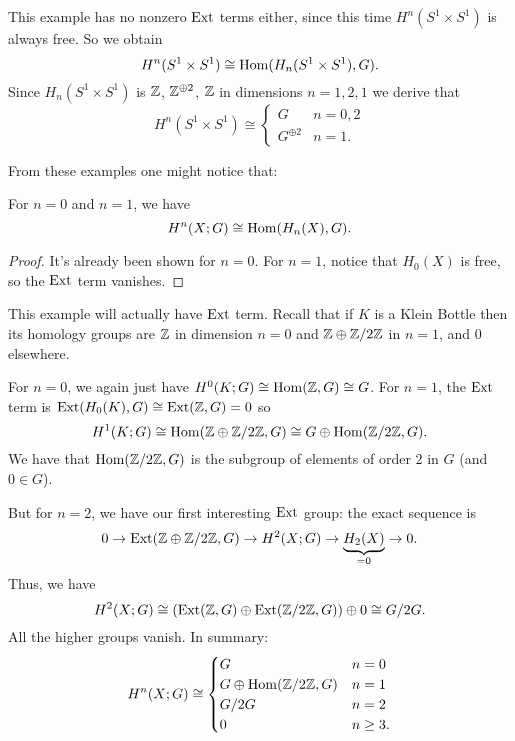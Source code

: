 \begin{example}
	This example has no nonzero $\operatorname{Ext}$ terms either,
	since this time $H^n(S^1 \times S^1)$ is always free.
	So we obtain
	\[ H^n(S^1 \times S^1) \cong \operatorname{Hom}(H_n(S^1 \times S^1), G). \]
	Since $H_n(S^1 \times S^1)$ is $\mathbb Z$, $\mathbb Z^{\oplus 2}$, $\mathbb Z$
	in dimensions $n=1,2,1$ we derive that
	\[
		H^n(S^1 \times S^1)
		\cong
		\begin{cases}
			G & n = 0,2 \\
			G^{\oplus 2} & n = 1.
		\end{cases}
	\]
\end{example}

From these examples one might notice that:
\begin{lemma}
	For $n = 0$ and $n = 1$, we have
	\[ H^n(X;G) \cong \operatorname{Hom}(H_n(X), G). \]
\end{lemma}
\begin{proof}
	It's already been shown for $n=0$.
	For $n=1$, notice that $H_0(X)$ is free,
	so the $\operatorname{Ext}$ term vanishes.
\end{proof}

\begin{example}
	This example will actually have $\operatorname{Ext}$ term.
	Recall that if $K$ is a Klein Bottle then its homology groups are
	$\mathbb Z$ in dimension $n=0$ and $\mathbb Z \oplus \mathbb Z/2\mathbb Z$ in $n=1$, and $0$ elsewhere.

	For $n=0$, we again just have $H^0(K;G) \cong \operatorname{Hom}(\mathbb Z, G) \cong G$.
	For $n=1$, the $\operatorname{Ext}$ term is $\operatorname{Ext}(H_0(K), G) \cong \operatorname{Ext}(\mathbb Z, G) = 0$
	so \[ H^1(K;G) \cong \operatorname{Hom}(\mathbb Z \oplus \mathbb Z/2\mathbb Z, G) \cong G \oplus \operatorname{Hom}(\mathbb Z/2\mathbb Z, G). \]
	We have that $\operatorname{Hom}(\mathbb Z/2\mathbb Z,G)$ is the subgroup
	of elements of order $2$ in $G$ (and $0 \in G$).

	But for $n=2$, we have our first interesting $\operatorname{Ext}$ group:
	the exact sequence is
	\[ 0 \to \operatorname{Ext}(\mathbb Z \oplus \mathbb Z/2\mathbb Z, G) \to H^2(X;G) \to \underbrace{H_2(X)}_{=0} \to 0. \]
	Thus, we have
	\[ H^2(X;G) \cong \left( \operatorname{Ext}(\mathbb Z,G) \oplus \operatorname{Ext}(\mathbb Z/2\mathbb Z,G) \right) \oplus 0
		\cong G/2G. \]
	All the higher groups vanish.
	In summary:
	\[
		H^n(X;G) \cong
		\begin{cases}
			G & n = 0 \\
			G \oplus \operatorname{Hom}(\mathbb Z/2\mathbb Z, G) & n = 1 \\
			G/2G & n = 2 \\
			0 & n \ge 3. 
		\end{cases}
	\]
\end{example}


